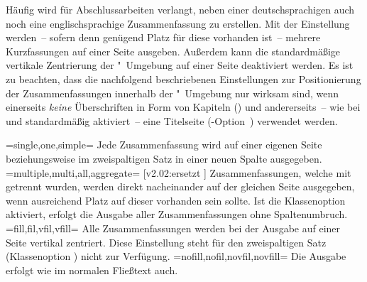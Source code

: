 \begin{DeclareEntity*}{}
\begin{DeclareEntity*}{}
\begin{DeclareEntity*}{}
\begin{Declaration}
Häufig wird für Abschlussarbeiten verlangt, neben einer deutschsprachigen auch 
noch eine englischsprachige Zusammenfassung zu erstellen. Mit der Einstellung 
 werden~-- sofern denn genügend Platz für diese 
vorhanden ist~-- mehrere Kurzfassungen auf einer Seite ausgeben. Außerdem kann 
die standardmäßige vertikale Zentrierung der "~Umgebung 
auf einer Seite deaktiviert werden. Es ist zu beachten, dass die nachfolgend 
beschriebenen Einstellungen zur Positionierung der Zusammenfassungen innerhalb 
der "~Umgebung nur wirksam sind, wenn einerseits 
\emph{keine} Überschriften in Form von Kapiteln ()
und andererseits~-- wie bei  und  
standardmäßig aktiviert~-- eine Titelseite 
(\KOMAScript-Option~) verwendet werden.
%
\begin{DeclareValues}
\itemval=single,one,simple=
  Jede Zusammenfassung wird auf einer eigenen Seite
  beziehungsweise im zweispaltigen Satz in einer neuen Spalte ausgegeben.
\itemval=multiple,multi,all,aggregate=%
    [v2.02:ersetzt ]
  Zusammenfassungen, welche mit  getrennt wurden, werden 
  direkt nacheinander auf der gleichen Seite ausgegeben, wenn ausreichend Platz 
  auf dieser vorhanden sein sollte. Ist die Klassenoption  
  aktiviert, erfolgt die Ausgabe aller Zusammenfassungen ohne Spaltenumbruch.
\itemval=fill,fil,vfil,vfill=
  Alle Zusammenfassungen werden bei der Ausgabe auf einer Seite vertikal 
  zentriert. Diese Einstellung steht für den zweispaltigen Satz
  (Klassenoption ) nicht zur Verfügung.
\itemval=nofill,nofil,novfil,novfill=
  Die Ausgabe erfolgt wie im normalen Fließtext auch.
\end{DeclareValues}
\end{Declaration}


\end{DeclareEntity*}
\end{DeclareEntity*}
\end{DeclareEntity*}
